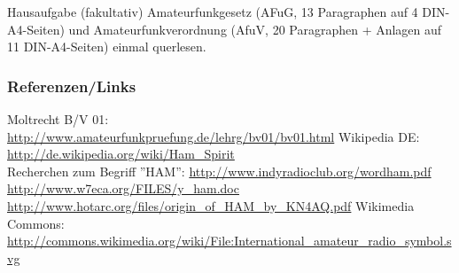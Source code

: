 \begin{frame}

    \begin{alertblock}{Hausaufgabe (fakultativ)}
        Amateurfunkgesetz (AFuG, 13 Paragraphen auf 4 DIN-A4-Seiten) und
        Amateurfunkverordnung (AfuV, 20 Paragraphen + Anlagen auf 11
        DIN-A4-Seiten) einmal querlesen.
    \end{alertblock}

\end{frame}

\renewcommand{\refname}{Referenzen}

\begin{frame}
    \frametitle{Referenzen/Links}
    \hypertarget{refs}{}
    \footnotesize

    \begin{thebibliography}{}
         Moltrecht B/V 01: \\
                        \url{http://www.amateurfunkpruefung.de/lehrg/bv01/bv01.html}
            Wikipedia DE: \\
                        \url{http://de.wikipedia.org/wiki/Ham_Spirit} \\
           Recherchen zum Begriff ''HAM'':
                        \url{http://www.indyradioclub.org/wordham.pdf} \\
                        \url{http://www.w7eca.org/FILES/y_ham.doc} \\
                        \url{http://www.hotarc.org/files/origin_of_HAM_by_KN4AQ.pdf}
            Wikimedia Commons: \\
                        \url{http://commons.wikimedia.org/wiki/File:International_amateur_radio_symbol.svg}
    \end{thebibliography} 
   
\end{frame}


